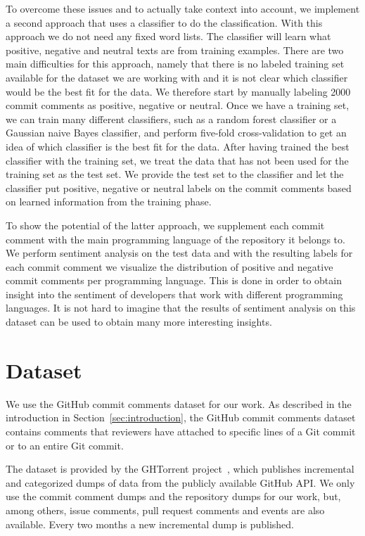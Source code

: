 \documentclass{article}
\begin{document}
To overcome these issues and to actually take context into account, we implement
a second approach that uses a classifier to do the classification. With this
approach we do not need any fixed word lists. The classifier will learn what
positive, negative and neutral texts are from training examples. There are two
main difficulties for this approach, namely that there is no labeled training
set available for the dataset we are working with and it is not clear which
classifier would be the best fit for the data. We therefore start by manually
labeling 2000 commit comments as positive, negative or neutral. Once we have a
training set, we can train many different classifiers, such as a random forest
classifier or a Gaussian naive Bayes classifier, and perform five-fold
cross-validation to get an idea of which classifier is the best fit for the
data. After having trained the best classifier with the training set, we treat
the data that has not been used for the training set as the test set. We
provide the test set to the classifier and let the classifier put positive,
negative or neutral labels on the commit comments based on learned information
from the training phase.

To show the potential of the latter approach, we supplement each commit
comment with the main programming language of the repository it belongs to.
We perform sentiment analysis on the test data and with the resulting labels
for each commit comment we visualize the distribution of positive and negative
commit comments per programming language. This is done in order to obtain
insight into the sentiment of developers that work with different programming
languages. It is not hard to imagine that the results of sentiment analysis on
this dataset can be used to obtain many more interesting insights.

\section{Dataset}\label{sec:dataset}
We use the GitHub commit comments dataset for our work. As described in the
introduction in Section~\ref{sec:introduction}, the GitHub commit comments
dataset contains comments that reviewers have attached to specific lines of
a Git commit or to an entire Git commit.

The dataset is provided by the GHTorrent project~\cite{ghtorrent}, which
publishes incremental and categorized dumps of data from the publicly
available GitHub API\@. We only use the commit comment dumps and the
repository dumps for our work, but, among others, issue comments, pull
request comments and events are also available. Every two months a new
incremental dump is published.
\end{document}
